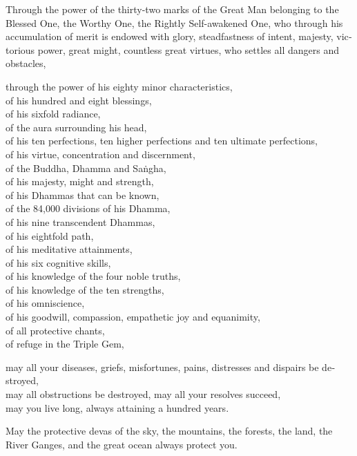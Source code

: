 \begin{english}
  Through the power of the thirty-two marks of the Great Man belonging to the
  Blessed One, the Worthy One, the Rightly Self-awakened One, who through his
  accumulation of merit is endowed with glory, steadfastness of intent, majesty,
  victorious power, great might, countless great virtues, who settles all
  dangers and obstacles,

  through the power of his eighty minor characteristics,\\
  of his hundred and eight blessings,\\
  of his sixfold radiance,\\
  of the aura surrounding his head,\\
  of his ten perfections, ten higher perfections and ten ultimate perfections,\\
  of his virtue, concentration and discernment,\\
  of the Buddha, Dhamma and Saṅgha,\\
  of his majesty, might and strength,\\
  of his Dhammas that can be known,\\
  of the 84,000 divisions of his Dhamma,\\
  of his nine transcendent Dhammas,\\
  of his eightfold path,\\
  of his meditative attainments,\\
  of his six cognitive skills,\\
  of his knowledge of the four noble truths,\\
  of his knowledge of the ten strengths,\\
  of his omniscience,\\
  of his goodwill, compassion, empathetic joy and equanimity,\\
  of all protective chants,\\
  of refuge in the Triple Gem,

  may all your diseases, griefs, misfortunes, pains, distresses and dispairs be destroyed,\\
  may all obstructions be destroyed, may all your resolves succeed,\\
  may you live long, always attaining a hundred years.

  May the protective devas of the sky, the mountains, the forests, the land, the
  River Ganges, and the great ocean always protect you.
\end{english}

